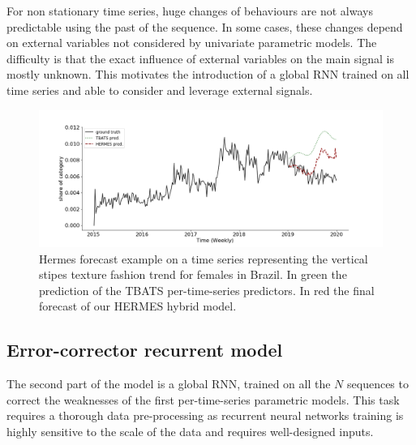 \documentclass[10pt]{article} %
\begin{document}
For non stationary time series, huge changes of behaviours are not always predictable using the past of the sequence. In some cases, these changes depend on external variables not considered by univariate parametric models. The difficulty is that the exact influence of external variables on the main signal is mostly unknown. This motivates the introduction of a global RNN trained on all time series and able to consider and leverage external signals.


\begin{figure}
\centering
  \includegraphics[width=\linewidth]{br_female_texture_verticalstripe}
\caption{Hermes forecast example on a time series representing the vertical stipes texture fashion trend for females in Brazil. In green the prediction of the TBATS per-time-series predictors. In red the final forecast of our HERMES hybrid model.}
\label{fig:introexamples}
\end{figure}

\subsection{Error-corrector recurrent model}

The second part of the model is a global RNN, trained on all the $N$ sequences to correct the weaknesses of the first per-time-series parametric models. This task requires a thorough data pre-processing as recurrent neural networks training is highly sensitive to the scale of the data and requires well-designed inputs.
\end{document}
